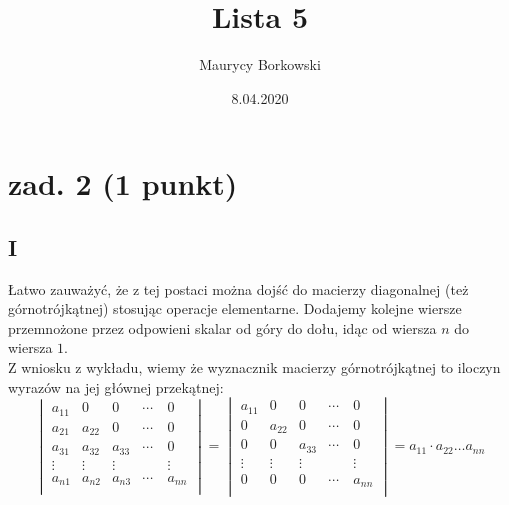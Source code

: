 \documentclass{article}
\title{Lista 5}
\date{8.04.2020}
\author{Maurycy Borkowski}
\begin{document}
\maketitle

\section{zad. 2 (1 punkt)}
\subsection*{I}
Łatwo zauważyć, że z tej postaci można dojść do macierzy diagonalnej (też górnotrójkątnej) stosując operacje elementarne. Dodajemy kolejne wiersze przemnożone przez odpowieni skalar od góry do dołu, idąc od wiersza $n$ do wiersza $1$.\\
Z wniosku z wykładu, wiemy że wyznacznik macierzy górnotrójkątnej to iloczyn wyrazów na jej głównej przekątnej:
$$
\begin{vmatrix}
a_{11} & 0 & 0 & \cdots & 0 \\
a_{21} & a_{22} & 0 & \cdots & 0 \\
a_{31} & a_{32} & a_{33} & \cdots & 0 \\
\vdots & \vdots & \vdots & \quad & \vdots \\
a_{n1} & a_{n2} & a_{n3} & \cdots & a_{nn} \\
\end{vmatrix} = 
\begin{vmatrix}
a_{11} & 0 & 0 & \cdots & 0 \\
0 & a_{22} & 0 & \cdots & 0 \\
0 & 0 & a_{33} & \cdots & 0 \\
\vdots & \vdots & \vdots & \quad & \vdots \\
0 & 0 & 0 & \cdots & a_{nn} \\
\end{vmatrix} = a_{11} \cdot a_{22} \dots a_{nn}
$$
\end{document}

